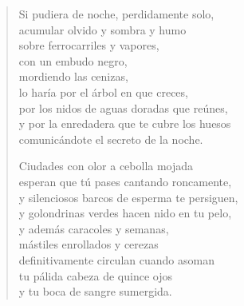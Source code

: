 \documentclass[12pt]{article}
\begin{document}
\begin{verse}
Si pudiera de noche, perdidamente solo,\\
acumular olvido y sombra y humo\\
sobre ferrocarriles y vapores,\\
con un embudo negro,\\
mordiendo las cenizas,\\
lo haría por el árbol en que creces,\\
por los nidos de aguas doradas que reúnes,\\
y por la enredadera que te cubre los huesos\\
comunicándote el secreto de la noche.  

Ciudades con olor a cebolla mojada\\
esperan que tú pases cantando roncamente,\\
y silenciosos barcos de esperma te persiguen,\\
y golondrinas verdes hacen nido en tu pelo,\\
y además caracoles y semanas,\\
mástiles enrollados y cerezas\\
definitivamente circulan cuando asoman\\
tu pálida cabeza de quince ojos\\
y tu boca de sangre sumergida.  


\end{verse}
\end{document}
